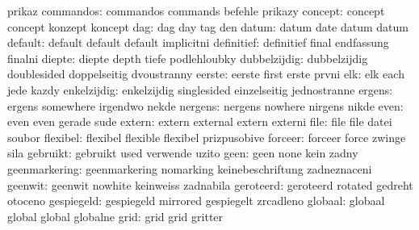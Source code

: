                       prikaz
          commandos:  commandos            commands            befehle
                      prikazy
            concept:  concept              concept             konzept
                      koncept
                dag:  dag                  day                 tag
                      den
              datum:  datum                date                datum
                      datum
            default:  default              default             default
                      implicitni
         definitief:  definitief           final               endfassung
                      finalni
             diepte:  diepte               depth               tiefe
                      podlehloubky %
       dubbelzijdig:  dubbelzijdig         doublesided         doppelseitig
                      dvoustranny
             eerste:  eerste               first               erste
                      prvni
                elk:  elk                  each                jede
                      kazdy
        enkelzijdig:  enkelzijdig          singlesided         einzelseitig
                      jednostranne
             ergens:  ergens               somewhere           irgendwo
                      nekde
            nergens:  nergens              nowhere             nirgens
                      nikde
               even:  even                 even                gerade
                      sude
             extern:  extern               external            extern
                      externi
               file:  file                 file                datei
                      soubor
           flexibel:  flexibel             flexible            flexibel
                      prizpusobive
            forceer:  forceer              force               zwinge
                      sila
           gebruikt:  gebruikt             used                verwende
                      uzito
               geen:  geen                 none                kein
                      zadny
      geenmarkering:  geenmarkering        nomarking           keinebeschriftung
                      zadneznaceni
            geenwit:  geenwit              nowhite             keinweiss
                      zadnabila
          geroteerd:  geroteerd            rotated             gedreht
                      otoceno
         gespiegeld:  gespiegeld           mirrored            gespiegelt
                      zrcadleno
            globaal:  globaal              global              global
                      globalne
               grid:  grid                 grid                gritter
